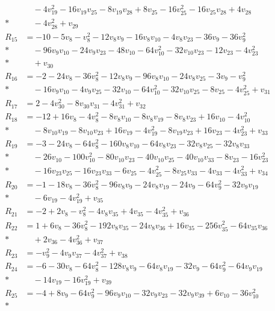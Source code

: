 \begin{align*}
&\quad-4v_{19}^{2}-16v_{19}v_{25}-8v_{19}v_{28}+8v_{25}-16v_{25}^{2}-16v_{25}v_{28}+4v_{28}\\*
&\quad-4v_{28}^{2}+v_{29}\\[2pt]
R_{15}&=-10-5v_{8}-v_{8}^{2}-12v_{8}v_{9}-16v_{8}v_{10}-4v_{8}v_{23}-36v_{9}-36v_{9}^{2}\\*
&\quad-96v_{9}v_{10}-24v_{9}v_{23}-48v_{10}-64v_{10}^{2}-32v_{10}v_{23}-12v_{23}-4v_{23}^{2}\\*
&\quad+v_{30}\\[2pt]
R_{16}&=-2-24v_{8}-36v_{8}^{2}-12v_{8}v_{9}-96v_{8}v_{10}-24v_{8}v_{25}-3v_{9}-v_{9}^{2}\\*
&\quad-16v_{9}v_{10}-4v_{9}v_{25}-32v_{10}-64v_{10}^{2}-32v_{10}v_{25}-8v_{25}-4v_{25}^{2}+v_{31}\\[2pt]
R_{17}&=2-4v_{30}^{2}-8v_{30}v_{31}-4v_{31}^{2}+v_{32}\\[2pt]
R_{18}&=-12+16v_{8}-4v_{8}^{2}-8v_{8}v_{10}-8v_{8}v_{19}-8v_{8}v_{23}+16v_{10}-4v_{10}^{2}\\*
&\quad-8v_{10}v_{19}-8v_{10}v_{23}+16v_{19}-4v_{19}^{2}-8v_{19}v_{23}+16v_{23}-4v_{23}^{2}+v_{33}\\[2pt]
R_{19}&=-3-24v_{8}-64v_{8}^{2}-160v_{8}v_{10}-64v_{8}v_{23}-32v_{8}v_{25}-32v_{8}v_{33}\\*
&\quad-26v_{10}-100v_{10}^{2}-80v_{10}v_{23}-40v_{10}v_{25}-40v_{10}v_{33}-8v_{23}-16v_{23}^{2}\\*
&\quad-16v_{23}v_{25}-16v_{23}v_{33}-6v_{25}-4v_{25}^{2}-8v_{25}v_{33}-4v_{33}-4v_{33}^{2}+v_{34}\\[2pt]
R_{20}&=-1-18v_{8}-36v_{8}^{2}-96v_{8}v_{9}-24v_{8}v_{19}-24v_{9}-64v_{9}^{2}-32v_{9}v_{19}\\*
&\quad-6v_{19}-4v_{19}^{2}+v_{35}\\[2pt]
R_{21}&=-2+2v_{8}-v_{8}^{2}-4v_{8}v_{35}+4v_{35}-4v_{35}^{2}+v_{36}\\[2pt]
R_{22}&=1+6v_{8}-36v_{8}^{2}-192v_{8}v_{35}-24v_{8}v_{36}+16v_{35}-256v_{35}^{2}-64v_{35}v_{36}\\*
&\quad+2v_{36}-4v_{36}^{2}+v_{37}\\[2pt]
R_{23}&=-v_{9}^{2}-4v_{9}v_{37}-4v_{37}^{2}+v_{38}\\[2pt]
R_{24}&=-6-30v_{8}-64v_{8}^{2}-128v_{8}v_{9}-64v_{8}v_{19}-32v_{9}-64v_{9}^{2}-64v_{9}v_{19}\\*
&\quad-14v_{19}-16v_{19}^{2}+v_{39}\\[2pt]
R_{25}&=-4+8v_{9}-64v_{9}^{2}-96v_{9}v_{10}-32v_{9}v_{23}-32v_{9}v_{39}+6v_{10}-36v_{10}^{2}\\*

\end{align*}
